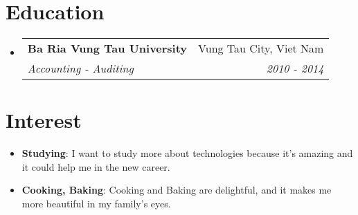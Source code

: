 \documentclass[letterpaper,11pt]{article}
\makeatletter
\newcommand{\resumeItem}[2]{
  \item\small{
    \textbf{#1}{: #2 \vspace{-2pt}}
  }
}
\newcommand{\resumeSubheading}[4]{
  \vspace{-1pt}\item
    \begin{tabular*}{0.97\textwidth}[t]{l@{\extracolsep{\fill}}r}
      \textbf{#1} & #2 \\
      \textit{\small#3} & \textit{\small #4} \\
    \end{tabular*}\vspace{-5pt}
}
\newcommand{\resumeSubItem}[2]{\resumeItem{#1}{#2}\vspace{-4pt}}
\newcommand{\resumeSubHeadingListStart}{\begin{itemize}[leftmargin=*]}
\newcommand{\resumeSubHeadingListEnd}{\end{itemize}}
\makeatother
\begin{document}
\section{Education}
  \resumeSubHeadingListStart
    \resumeSubheading
      {Ba Ria Vung Tau University}{Vung Tau City, Viet Nam}
      {Accounting - Auditing}{2010 - 2014}
  \resumeSubHeadingListEnd

\section{Interest}
  \resumeSubHeadingListStart
    \resumeSubItem{Studying}
      {I want to study more about technologies because it's amazing and it could help me in the new career.}
    \resumeSubItem{Cooking, Baking}
      {Cooking and Baking are delightful, and it makes me more beautiful in my family's eyes.}
  \resumeSubHeadingListEnd

\end{document}
